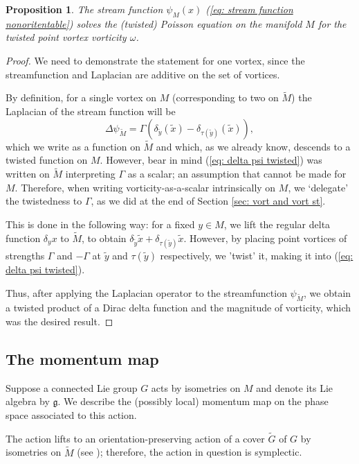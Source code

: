 \documentclass[11pt,twoside]{article}
\newtheorem{prop}[theorem]{Proposition}
\theoremstyle{definition}
\numberwithin{equation}{section}
\def\Mt{\widetilde{M}}
\def\Gt{\widetilde{G}}
\def\xt{\tilde{x}}
\def\yt{\tilde{y}}
\begin{document}
\begin{prop}
    The stream function $\psi_{M}(x)$ (\ref{eq: stream function nonoritentable}) solves the (twisted) Poisson equation on the manifold $M$ for the twisted point vortex vorticity $\omega$.
\end{prop}
\begin{proof}
We need to demonstrate the statement for one vortex, since the streamfunction and Laplacian are additive on the set of vortices.

By definition, for a single vortex on $M$ (corresponding to two on $\Mt$) the  Laplacian of the stream function will be 
\begin{equation}
\label{eq: delta psi twisted}
\Delta\psi_{\Mt}  = \Gamma(\delta_{\yt}(\xt)- \delta_{\tau(\yt)}(\xt)),
\end{equation}
which we write as a function on $\Mt$ and which, as we already know, descends to  a twisted function on $M$. 
However,  bear in mind (\ref{eq: delta psi twisted}) was written on $\Mt$ interpreting $\Gamma$ as a scalar; an assumption that cannot be made for $M$. Therefore, when writing vorticity-as-a-scalar intrinsically on $M$, we  `delegate' the twistedness  to $\Gamma$, as we did at the end of Section \ref{sec: vort and vort st}. 

This is done in the following way: for a fixed $y\in M $, we lift the regular delta function $\delta_y x$ to $\Mt$, to obtain $\delta_{\yt} \xt + \delta_{\tau(\yt)}\xt$. However, by placing point vortices of strengths $\Gamma$ and $-\Gamma$ at $\yt $ and $\tau(\yt)$ respectively, we 'twist' it, making it into (\ref{eq: delta psi twisted}).

Thus, after applying the Laplacian operator to the streamfunction $\psi_{\Mt}$, we obtain a twisted product of a Dirac delta function and the magnitude of vorticity, which was the desired result.
\end{proof}


   
  


\subsection{The momentum map} \label{sec:momentum map}\def\gg{\mathfrak{g}}
Suppose a connected Lie group $G$ acts by isometries on $M$ and denote its Lie algebra by $\gg$. We describe the (possibly local) momentum map on the phase space associated to this action. 

The action lifts to an orientation-preserving  action of {\red a cover $\Gt$ of $G$} by isometries on $\Mt$ (see \cite{bredon1972introduction}); therefore, the action in question is symplectic. 
\end{document}
